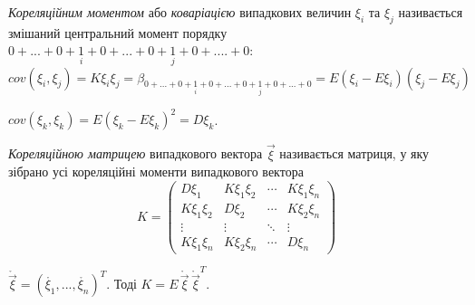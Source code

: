 \begin{definition}
    \emph{Кореляційним моментом} або 
    \emph{коваріацією} випадкових величин 
    $\xi_i$ та $\xi_j$ називається змішаний 
    центральний момент 
    порядку
    $0+...+0+\underset{i}{1}+0+...+0+\underset{j}{1}+0+....+0$:
    \begin{equation*}
        {cov}(\xi_i,\xi_j) = K\xi_i\xi_j = \beta_{0+...+0+\underset{i}{1}+0+...
        +0+\underset{j}{1}+0+...+0}
        =
        E(\xi_i-E\xi_i)(\xi_j-E\xi_j)
    \end{equation*}
\end{definition}
\begin{remark}
    ${cov}(\xi_k, \xi_k) = E(\xi_k-E\xi_k)^2 = D\xi_k$.
\end{remark}
\begin{definition}
   \emph{Кореляційною матрицею} випадкового 
   вектора $\vec{\xi}$ називається матриця, у яку зібрано усі 
   кореляційні моменти випадкового вектора
   \begin{equation*}
       K = 
       \begin{pmatrix}
           D\xi_1 & K\xi_1\xi_2 & \cdots & K\xi_1\xi_n \\
           K\xi_1\xi_2 & D\xi_2 & \cdots & K\xi_2\xi_n \\
           \vdots & \vdots & \ddots & \vdots \\
           K\xi_1\xi_n & K\xi_2\xi_n & \cdots & D\xi_n
       \end{pmatrix}
   \end{equation*} 
\end{definition}
\begin{remark}
    $\mathring{\vec{\xi}} = \left(\mathring{\xi_1}, ..., \mathring{\xi_n}
    \right)^T$.
    Тоді $K = E\,\mathring{\vec{\xi}}\,\mathring{\vec{\xi}}^T$.
\end{remark}

